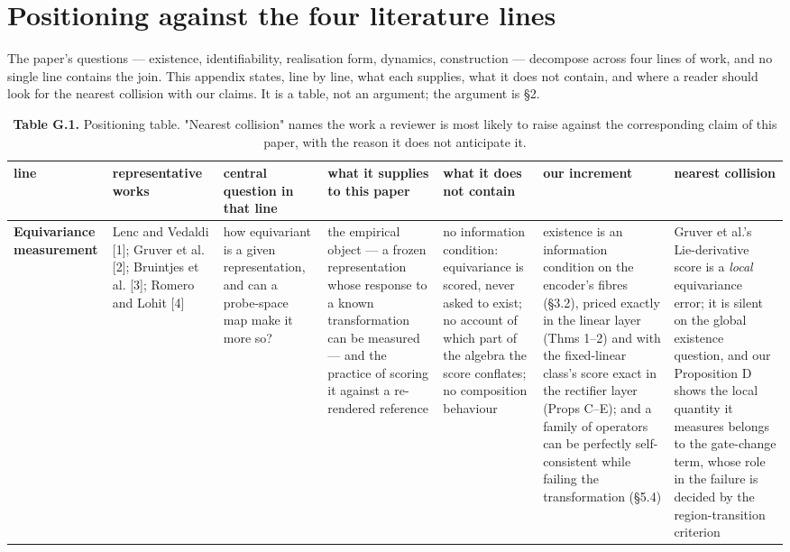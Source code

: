 \section{Positioning against the four literature lines}

The paper's questions --- existence, identifiability, realisation form, dynamics, construction --- decompose across four lines of work, and no single line contains the join. This appendix states, line by line, what each supplies, what it does not contain, and where a reader should look for the nearest collision with our claims. It is a table, not an argument; the argument is \S{}2.


\begin{table}[t]
\centering
\scriptsize
\caption*{\textbf{Table G.1.} Positioning table. "Nearest collision" names the work a reviewer is most likely to raise against the corresponding claim of this paper, with the reason it does not anticipate it.}
\setlength{\tabcolsep}{2pt}
\begin{tabularx}{\textwidth}{@{}>{\raggedright\arraybackslash}X >{\raggedright\arraybackslash}X >{\raggedright\arraybackslash}X >{\raggedright\arraybackslash}X >{\raggedright\arraybackslash}X >{\raggedright\arraybackslash}X >{\raggedright\arraybackslash}X@{}}
\toprule
\textbf{line} & \textbf{representative works} & \textbf{central question in that line} & \textbf{what it supplies to this paper} & \textbf{what it does not contain} & \textbf{our increment} & \textbf{nearest collision} \\
\midrule
\textbf{Equivariance measurement} & Lenc and Vedaldi [1]; Gruver et al. [2]; Bruintjes et al. [3]; Romero and Lohit [4] & how equivariant is a given representation, and can a probe-space map make it more so? & the empirical object --- a frozen representation whose response to a known transformation can be measured --- and the practice of scoring it against a re-rendered reference & no information condition: equivariance is scored, never asked to exist; no account of which part of the algebra the score conflates; no composition behaviour & existence is an information condition on the encoder's fibres (\S{}3.2), priced exactly in the linear layer (Thms 1--2) and with the fixed-linear class's score exact in the rectifier layer (Props C--E); and a family of operators can be perfectly self-consistent while failing the transformation (\S{}5.4) & Gruver et al.'s Lie-derivative score is a \textit{local} equivariance error; it is silent on the global existence question, and our Proposition D shows the local quantity it measures belongs to the gate-change term, whose role in the failure is decided by the region-transition criterion \\

\end{tabularx}
\end{table}
